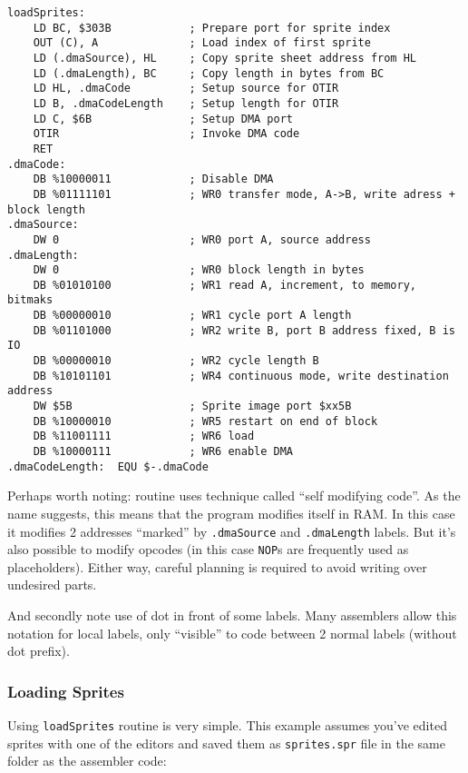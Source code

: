 \begin{lstlisting}
loadSprites:
    LD BC, $303B            ; Prepare port for sprite index
    OUT (C), A              ; Load index of first sprite
    LD (.dmaSource), HL     ; Copy sprite sheet address from HL
    LD (.dmaLength), BC     ; Copy length in bytes from BC
    LD HL, .dmaCode         ; Setup source for OTIR
    LD B, .dmaCodeLength    ; Setup length for OTIR
    LD C, $6B               ; Setup DMA port
    OTIR                    ; Invoke DMA code
    RET
.dmaCode:
    DB %10000011            ; Disable DMA
    DB %01111101            ; WR0 transfer mode, A->B, write adress + block length
.dmaSource:
    DW 0                    ; WR0 port A, source address
.dmaLength:
    DW 0                    ; WR0 block length in bytes
    DB %01010100            ; WR1 read A, increment, to memory, bitmaks
    DB %00000010            ; WR1 cycle port A length
    DB %01101000            ; WR2 write B, port B address fixed, B is IO
    DB %00000010            ; WR2 cycle length B
    DB %10101101            ; WR4 continuous mode, write destination address
    DW $5B                  ; Sprite image port $xx5B
    DB %10000010            ; WR5 restart on end of block
    DB %11001111            ; WR6 load
    DB %10000111            ; WR6 enable DMA
.dmaCodeLength:  EQU $-.dmaCode
\end{lstlisting}

Perhaps worth noting: routine uses technique called ``self modifying code''. As the name suggests, this means that the program modifies itself in RAM. In this case it modifies 2 addresses ``marked'' by {\tt .dmaSource} and {\tt .dmaLength} labels. But it's also possible to modify opcodes (in this case {\tt NOP}s are frequently used as placeholders). Either way, careful planning is required to avoid writing over undesired parts.

And secondly note use of dot in front of some labels. Many assemblers allow this notation for local labels, only ``visible'' to code between 2 normal labels (without dot prefix).


\pagebreak
\subsubsection{Loading Sprites}

Using {\tt loadSprites} routine is very simple. This example assumes you've edited sprites with one of the editors and saved them as {\tt sprites.spr} file in the same folder as the assembler code:

